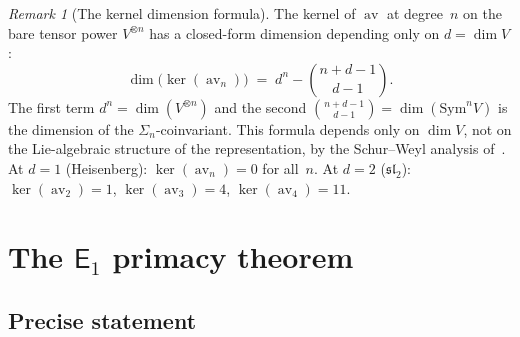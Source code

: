 \documentclass[11pt,reqno]{amsart}
\theoremstyle{definition}
\theoremstyle{remark}
\newtheorem{remark}[theorem]{Remark}
\newcommand{\Eone}{\mathsf{E}_{1}}
\newcommand{\Sym}{\mathrm{Sym}}
\DeclareMathOperator{\av}{av}
\numberwithin{equation}{section}
\begin{document}
\begin{remark}[The kernel dimension formula]
\label{rem:ker-av-formula}
The kernel of $\av$ at degree~$n$ on the bare tensor power
$V^{\otimes n}$ has a closed-form dimension depending only on
$d = \dim V$:
\begin{equation}\label{eq:ker-av-dim}
  \dim\bigl(\ker(\av_n)\bigr)
  \;=\;
  d^n - \binom{n+d-1}{d-1}.
\end{equation}
The first term $d^n = \dim(V^{\otimes n})$ and the second
$\binom{n+d-1}{d-1} = \dim(\Sym^n V)$ is the dimension of the
$\Sigma_n$-coinvariant. This formula depends only on $\dim V$, not on
the Lie-algebraic structure of the representation, by the Schur--Weyl
analysis of~\cite[Proposition~6.1]{Lor26}. At $d = 1$
(Heisenberg): $\ker(\av_n) = 0$ for all~$n$. At $d = 2$
($\mathfrak{sl}_2$): $\ker(\av_2) = 1$,
$\ker(\av_3) = 4$, $\ker(\av_4) = 11$.
\end{remark}

\section{The $\Eone$ primacy theorem}
\label{sec:e1-primacy}

\subsection{Precise statement}
\end{document}
